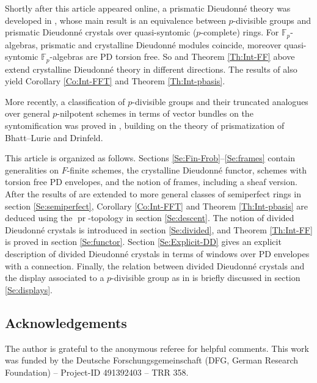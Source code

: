 \documentclass[a4paper,11pt]{article}
\theoremstyle{plain}
\theoremstyle{definition}
\theoremstyle{remark}
\theoremstyle{definition}
\numberwithin{Lemma}{section}
\numberwithin{Subpoint}{Lemma}
\numberwithin{equation}{section}
\newcommand{\FF}{{\mathbb{F}}}
\newcommand{\nameoftop}{{\operatorname{pr}}}
\newcommand{\chang}[1]{{#1}}
\begin{document}
\chang{Shortly after this article appeared online, a prismatic Dieudonn\'e theory was developed in \cite{Anschuetz-LeBras}, whose main result is an equivalence between $p$-divisible groups and prismatic Dieudonn\'e crystals over quasi-syntomic ($p$-complete) rings.} 
For $\FF_p$-algebras, prismatic and crystalline Dieudonn\'e modules coincide, moreover quasi-syntomic $\FF_p$-algebras are PD torsion free. So \cite{Anschuetz-LeBras} and Theorem \ref{Th:Int-FF} above extend crystalline Dieudonn\'e theory in different directions. The results of \cite{Anschuetz-LeBras} also yield Corollary \ref{Co:Int-FFT} and Theorem \ref{Th:Int-pbasis}.

\chang{More recently, a classification of $p$-divisible groups and their truncated analogues over general $p$-nilpotent schemes in terms of vector bundles on the syntomification was proved in \cite{Gardner-Madapusi}, building on the theory of prismatization of Bhatt--Lurie and Drinfeld.}

\bigskip
\noindent
This article is organized as follows. 
Sections \ref{Se:Fin-Frob}--\ref{Se:frames}
contain generalities on $F$-finite schemes, 
the crystalline Dieudonn\'e functor, 
schemes with torsion free PD envelopes,
and the notion of frames, including a sheaf version.
After the results of \cite{Lau:Semiperfect} are extended
to more general classes of semiperfect rings 
in section \ref{Se:semiperfect},
Corollary \ref{Co:Int-FFT} and Theorem \ref{Th:Int-pbasis}
are deduced using the $\nameoftop$-topology 
in section \ref{Se:descent}.
The notion of divided Dieudonn\'e crystals is introduced 
in section \ref{Se:divided}, and Theorem \ref{Th:Int-FF} is proved in section \ref{Se:functor}.
Section \ref{Se:Explicit-DD} gives an explicit description of divided Dieudonn\'e crystals in terms of windows over PD envelopes with a connection.
Finally, the relation between
divided Dieudonn\'e crystals and the display associated to
a $p$-divisible group as in \cite{Zink:Display, Lau:Smoothness}
is briefly discussed in section \ref{Se:displays}.

\subsection*{Acknowledgements}

\chang{The author is grateful to the anonymous referee for helpful comments. 
This work was 
funded by the Deutsche Forschungsgemeinschaft (DFG, German Research
Foundation) -- Project-ID 491392403 -- TRR 358.
}

\endgroup
\end{document}
